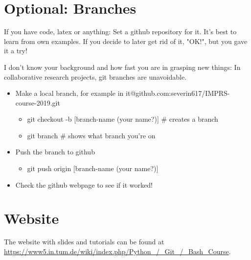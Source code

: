 \documentclass[11pt]{article}
\begin{document}
\section*{Optional: Branches}
If you have code, latex or anything: Set a github repository for it. It's best to learn from own examples. If you decide to later get rid of it, "OK!", but you gave it a try!
 
I don't know your background and how fast you are in grasping new things: In collaborative research projects, git branches are unavoidable.
\begin{itemize}
\item Make a local branch, for example in it@github.com:severin617/IMPRS-course-2019.git
\begin{itemize}
\item[] git checkout -b [branch-name (your name?)] \# creates a branch
\item[] git branch \# shows what branch you're on 
\end{itemize}
\item Push the branch to github
\begin{itemize}
\item[] git push origin [branch-name (your name?)]
\end{itemize}
\item Check the github webpage to see if it worked!
\end{itemize}



\section*{Website}
\label{sec:Website}
The website with slides and tutorials can be found at\\
\url{https://www5.in.tum.de/wiki/index.php/Python_/_Git_/_Bash_Course}.
\end{document}
